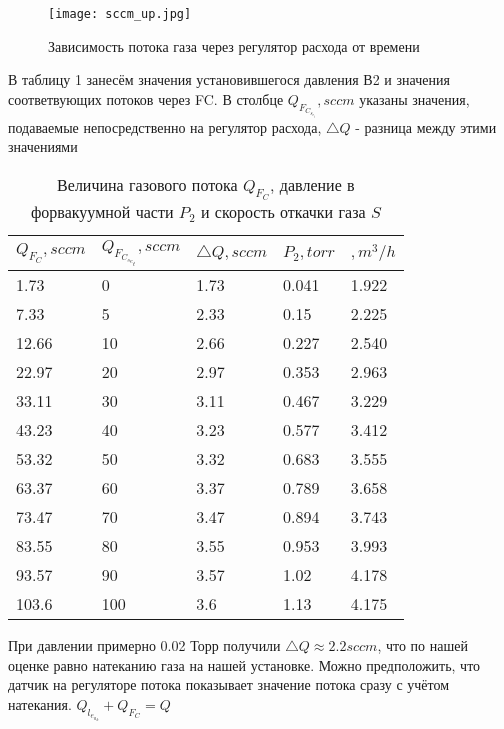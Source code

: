 \documentclass{article}
\begin{document}
\begin{figure}[H]
    \centering
    \texttt{[image: sccm\_up.jpg]}
    \caption{Зависимость потока газа через регулятор расхода от времени}
    \label{fig:vac}
\end{figure}


В таблицу 1 занесём значения установившегося давления В2 и значения соответвующих потоков через FC. В столбце $Q_F_C_s_e_t, sccm$ указаны значения, подаваемые непосредственно на регулятор расхода, $\triangle Q$ - разница между этими значениями

\begin{table}[h]
    \centering
    \begin{center}
    \caption{Величина газового потока $Q_F_C$, давление в форвакуумной части $P_2$ и скорость откачки газа $S$}
        \label{tab:my_label}
    \end{center}
   \begin{tabular}{ |p{2cm}|p{2cm}|p{2cm}|p{2cm}|p{2cm}|  }
 \hline
 $Q_F_C, sccm$ & $Q_F_C_s_e_t, sccm$ & $\triangle Q, sccm$ & $P_2, torr$ & $, m^3/h$   \\
\hline

 1.73 & 0 & 1.73 & 0.041 & 1.922 \\
 7.33 & 5 & 2.33 & 0.15 & 2.225  \\
 12.66 & 10 & 2.66 & 0.227 & 2.540 \\
 22.97 & 20 & 2.97 & 0.353 & 2.963\\
 33.11 & 30 & 3.11 & 0.467 & 3.229 \\
 43.23 & 40 & 3.23 & 0.577 & 3.412 \\
 53.32 & 50 & 3.32 & 0.683 & 3.555\\
 63.37 & 60 & 3.37 & 0.789 & 3.658 \\
 73.47 & 70 & 3.47 & 0.894 & 3.743 \\
 83.55 & 80 & 3.55 & 0.953 & 3.993 \\
 93.57 & 90 & 3.57 & 1.02 & 4.178 \\
 103.6 & 100 & 3.6 & 1.13 & 4.175 \\
 \hline
\end{tabular}

\end{table}

При давлении примерно 0.02 Торр получили $\triangle Q \approx 2.2 sccm $, что по нашей оценке равно натеканию газа на нашей установке. Можно предположить, что датчик на регуляторе потока показывает значение потока сразу с учётом натекания. $Q_l_e_a_k + Q_F_C = Q$
\end{document}
